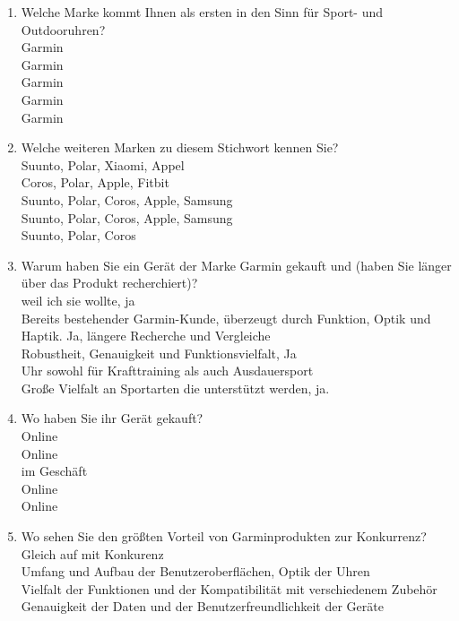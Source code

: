\begin{enumerate}
    \item Welche Marke kommt Ihnen als ersten in den Sinn für Sport- und Outdooruhren? \\
    Garmin \\
    Garmin \\
    Garmin \\
    Garmin \\
    Garmin
    \item Welche weiteren Marken zu diesem Stichwort kennen Sie? \\
    Suunto, Polar, Xiaomi, Appel \\
    Coros, Polar, Apple, Fitbit \\
    Suunto, Polar, Coros, Apple, Samsung \\
    Suunto, Polar, Coros, Apple, Samsung \\
    Suunto, Polar, Coros
    \item Warum haben Sie ein Gerät der Marke Garmin gekauft und (haben Sie länger über das Produkt recherchiert)? \\
    weil ich sie wollte, ja  \\
    Bereits bestehender Garmin-Kunde, überzeugt durch Funktion, Optik und Haptik. Ja, längere Recherche und Vergleiche \\
    Robustheit, Genauigkeit und Funktionsvielfalt, Ja \\
    Uhr sowohl für Krafttraining als auch Ausdauersport \\
    Große Vielfalt an Sportarten die unterstützt werden, ja.
    \item Wo haben Sie ihr Gerät gekauft? \\
    Online \\
    Online \\
    im Geschäft \\
    Online \\
    Online
    \item Wo sehen Sie den größten Vorteil von Garminprodukten zur Konkurrenz? \\
    Gleich auf mit Konkurenz \\
    Umfang und Aufbau der Benutzeroberflächen, Optik der Uhren \\
    Vielfalt der Funktionen und der Kompatibilität mit verschiedenem Zubehör \\
    Genauigkeit der Daten und der Benutzerfreundlichkeit der Geräte \\

\end{enumerate}
